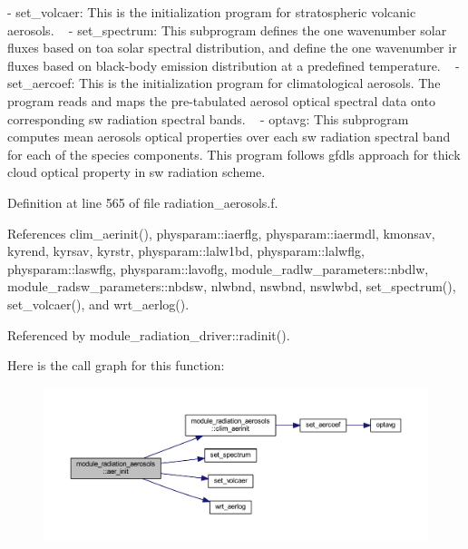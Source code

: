  -\/ set\+\_\+volcaer\+: This is the initialization program for stratospheric volcanic aerosols. ~\newline
 -\/ set\+\_\+spectrum\+: This subprogram defines the one wavenumber solar fluxes based on toa solar spectral distribution, and define the one wavenumber ir fluxes based on black-\/body emission distribution at a predefined temperature. ~\newline
 -\/ set\+\_\+aercoef\+: This is the initialization program for climatological aerosols. The program reads and maps the pre-\/tabulated aerosol optical spectral data onto corresponding sw radiation spectral bands. ~\newline
 -\/ optavg\+: This subprogram computes mean aerosols optical properties over each sw radiation spectral band for each of the species components. This program follows gfdl\textquotesingle{}s approach for thick cloud optical property in sw radiation scheme. 

Definition at line 565 of file radiation\+\_\+aerosols.\+f.



References clim\+\_\+aerinit(), physparam\+::iaerflg, physparam\+::iaermdl, kmonsav, kyrend, kyrsav, kyrstr, physparam\+::lalw1bd, physparam\+::lalwflg, physparam\+::laswflg, physparam\+::lavoflg, module\+\_\+radlw\+\_\+parameters\+::nbdlw, module\+\_\+radsw\+\_\+parameters\+::nbdsw, nlwbnd, nswbnd, nswlwbd, set\+\_\+spectrum(), set\+\_\+volcaer(), and wrt\+\_\+aerlog().



Referenced by module\+\_\+radiation\+\_\+driver\+::radinit().



Here is the call graph for this function\+:\nopagebreak
\begin{figure}[H]
\begin{center}
\leavevmode
\includegraphics[width=350pt]{namespacemodule__radiation__aerosols_a6086afe5183a09ca64810af7fe2a12ac_cgraph}
\end{center}
\end{figure}




